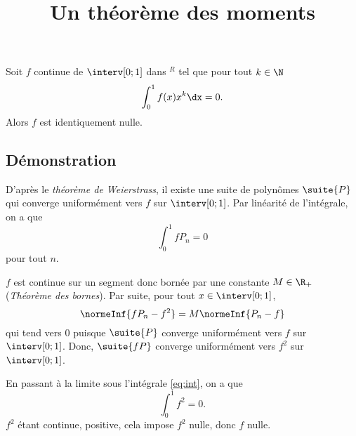\documentclass[fontsize=12pt,twoside=false,parskip=half]{scrartcl}
\title{Un théorème des moments}
\date{}
\author{}
\begin{document}
\maketitle
   \begin{Theoreme}
      Soit $f$ continue de $\interv[0; 1]$ dans $^R$ tel que pour tout $k \in \N$
      \[
         \int_0^1 f(x)x^k \dx = 0.
      \]
      Alors $f$ est identiquement nulle.
   \end{Theoreme}
   \subsection{Démonstration}
      D’après le \emph{théorème de Weierstrass}, il existe une suite de polynômes $\suite{P}$ qui converge
      uniformément vers $f$ sur $\interv[0; 1]$. Par linéarité de l’intégrale, on a que
      \begin{equation}
         \int_0^1 fP_n = 0 \label{eq:int}
      \end{equation}
      pour tout $n$. 
      
      $f$ est continue sur un segment donc bornée par une constante $M \in \R_+$ (\emph{Théorème des bornes}).
      Par suite, pour tout $x \in  \interv[0; 1]$,
      \[
         \normeInf{fP_n - f^2} = M\normeInf{P_n - f}
      \]
      qui tend vers 0 puisque $\suite{P}$ converge uniformément vers $f$ sur $\interv[0; 1]$. Donc, $\suite{fP}$ converge 
      uniformément vers $f^2$ sur $\interv[0; 1]$.
      
      En passant à la limite sous l’intégrale \eqref{eq:int}, on a que
      \[
         \int_0^1 f^2 = 0.
      \]
      $f^2$ étant continue, positive, cela impose $f^2$ nulle, donc $f$ nulle.
\end{document}
